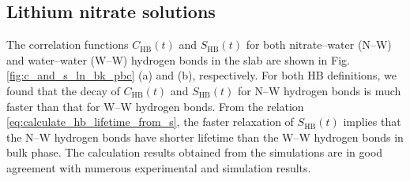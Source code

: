 \subsection{Lithium nitrate solutions} \label{PARAGRAPH_LINO3}
%
%
The correlation functions $C_\text{HB}(t)$ and $S_\text{HB}(t)$ for both nitrate--water (N--W) and water--water (W--W) hydrogen bonds 
in the slab are shown in Fig.\thinspace\ref{fig:c_and_s_ln_bk_pbc} (a) and (b), respectively.
For both HB definitions, we found that the decay of $C_\text{HB}(t)$ and $S_\text{HB}(t)$ for N--W hydrogen bonds is much faster 
than that for W--W hydrogen bonds. From the relation \ref{eq:calculate_hb_lifetime_from_s}, the faster relaxation of $S_\text{HB}(t)$ implies that 
the N--W hydrogen bonds have shorter lifetime than the W--W hydrogen bonds in bulk phase. 
The calculation results obtained from the simulations are in good agreement with numerous experimental and simulation results. \cite{PS03,Vrbka2004,Tongraar2006,Otten2007} 
